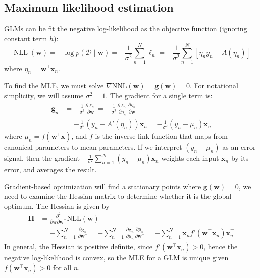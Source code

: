 \documentclass[11pt]{article}
\begin{document}
\subsection{Maximum likelihood estimation}

GLMs can be fit the negative log-likelihood as the objective function (ignoring constant term $h$):
\[
\operatorname{NLL}(\mathbf{w})
= -\log p(\mathcal{D} \mid \mathbf{w})
= -\frac{1}{\sigma^2}\sum_{n=1}^{N}\ell_n 
= -\frac{1}{\sigma^2}\sum_{n=1}^{N}[\eta_n y_n - A(\eta_n)]
\]
where $\eta_n = \mathbf{w}^{\mathsf{T}}\mathbf{x}_n$. 

To find the MLE, we must solve $\nabla \text{NNL}(\mathbf{w}) = \mathbf{g(w)} = 0$. For notational simplicity, we will assume $\sigma^2 = 1$. The gradient for a single term is:
\[
\begin{aligned}
\mathbf{g}_n &= 
-\frac{1}{\sigma^2}\frac{\partial \ell_n}{\partial \mathbf{w}}
=-\frac{1}{\sigma^2} \frac{\partial \ell_n}{\partial \eta_n}\frac{\partial \eta_n}{\partial \mathbf{w}} \\
&=-\frac{1}{\sigma^2} \left(y_n - A'(\eta_n)\right)\mathbf{x}_n
=-\frac{1}{\sigma^2} (y_n - \mu_n)\mathbf{x}_n
\end{aligned}
\]
where $\mu_n = f(\mathbf{w^{\mathsf{T}} x})$, and $f$ is the inverse link function that maps from canonical parameters to mean parameters. If we interpret $(y_n - \mu_n)$ as an error signal, then the gradient $-\frac{1}{\sigma^2}\sum_{n=1}^{N}(y_n - \mu_n)\mathbf{x}_n$ weights each input $\mathbf{x}_n$ by its error, and averages the result.

Gradient-based optimization will find a stationary points where $\mathbf{g(w)} = 0$, we need to examine the Hessian matrix to determine whether it is the global optimum. The Hessian is given by 
\[
\begin{aligned}
\mathbf{H} &= \frac{\partial^2}{\partial \boldsymbol{w}\partial \boldsymbol{w}^\top}\text{NLL}(\boldsymbol{w}) \\ 
&= -\sum_{n=1}^N \frac{\partial \boldsymbol{g}_n}{\partial \boldsymbol{w}^\top}
= -\sum_{n=1}^N \frac{\partial \boldsymbol{g}_n}{\partial \mu_n}\frac{\partial \mu_n}{\partial \boldsymbol{w}^\top}
= -\sum_{n=1}^N \boldsymbol{x}_n f'(\boldsymbol{w}^\top \boldsymbol{x}_n)\boldsymbol{x}_n^\top
\end{aligned} 
\]
In general, the Hessian is positive definite, since $f'(\boldsymbol{w}^\top \boldsymbol{x}_n) > 0$, hence the negative log-likelihood is convex, so the MLE for a GLM is unique given $f(\boldsymbol{w}^\top \boldsymbol{x}_n) > 0$ for all $n$.
\end{document}
